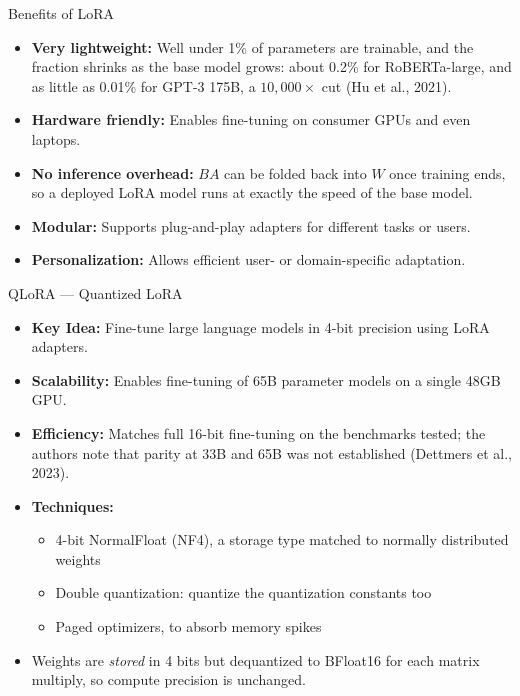 \begin{frame}[t]{Benefits of LoRA}
  \begin{itemize}\itemsep0.4em
    \item[\textcolor{red}{$\blacktriangleright$}] \textbf{Very lightweight:} Well under 1\% of parameters are trainable, and the fraction shrinks as the base model grows: about 0.2\% for RoBERTa-large, and as little as 0.01\% for GPT-3 175B, a $10{,}000\times$ cut (Hu et al., 2021).
    \item[\textcolor{red}{$\blacktriangleright$}] \textbf{Hardware friendly:} Enables fine-tuning on consumer GPUs and even laptops.
    \item[\textcolor{red}{$\blacktriangleright$}] \textbf{No inference overhead:} $BA$ can be folded back into $W$ once training ends, so a deployed LoRA model runs at exactly the speed of the base model.
    \item[\textcolor{red}{$\blacktriangleright$}] \textbf{Modular:} Supports plug-and-play adapters for different tasks or users.
    \item[\textcolor{red}{$\blacktriangleright$}] \textbf{Personalization:} Allows efficient user- or domain-specific adaptation.
  \end{itemize}
\end{frame}

\begin{frame}{QLoRA --- Quantized LoRA}
  \begin{itemize}
    \item[\textcolor{red}{$\blacktriangleright$}] \textbf{Key Idea:} Fine-tune large language models in 4-bit precision using LoRA adapters.
    \item[\textcolor{red}{$\blacktriangleright$}] \textbf{Scalability:} Enables fine-tuning of 65B parameter models on a single 48GB GPU.
    \item[\textcolor{red}{$\blacktriangleright$}] \textbf{Efficiency:} Matches full 16-bit fine-tuning on the benchmarks tested; the authors note that parity at 33B and 65B was not established (Dettmers et al., 2023).
    \item[\textcolor{red}{$\blacktriangleright$}] \textbf{Techniques:}
      \begin{itemize}
        \item 4-bit NormalFloat (NF4), a storage type matched to normally distributed weights
        \item Double quantization: quantize the quantization constants too
        \item Paged optimizers, to absorb memory spikes
      \end{itemize}
    \item[\textcolor{red}{$\blacktriangleright$}] Weights are \emph{stored} in 4 bits but dequantized to BFloat16 for each matrix multiply, so compute precision is unchanged.
  \end{itemize}
\end{frame}

